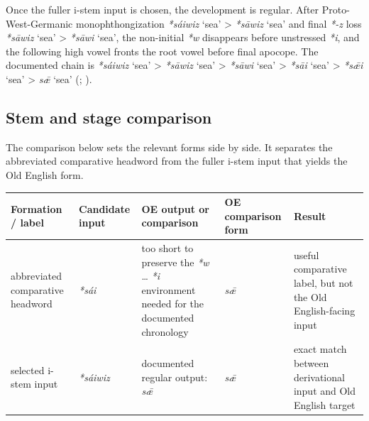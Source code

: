\documentclass[
  british,
  a4paper,
  openany]{book}
\newcounter{none} %
\providecommand{\Recon}[1]{\emph{*#1}}
{\catcode`→=\active \global\def→{\ensuremath{\rightarrow}}}
\providecommand{\Recon}[1]{\emph{*#1}}
{\catcode`→=\active \global\def→{\ensuremath{\rightarrow}}}
\begin{document}
Once the fuller i-stem input is chosen, the development is regular.
After Proto-West-Germanic monophthongization \Recon{sáiwiz} `sea'
\textgreater{} \Recon{sāwiz} `sea' and final \emph{*-z} loss
\Recon{sāwiz} `sea' \textgreater{} \Recon{sāwi} `sea', the non-initial
\emph{*w} disappears before unstressed \emph{*i}, and the following high
vowel fronts the root vowel before final apocope. The documented chain
is \Recon{sáiwiz} `sea' \textgreater{} \Recon{sāwiz} `sea'
\textgreater{} \Recon{sāwi} `sea' \textgreater{} \Recon{sāi} `sea'
\textgreater{} \Recon{sǣi} `sea' \textgreater{} \emph{sǣ} `sea'
(;
).

\subsection{Stem and stage comparison}\label{stem-and-stage-comparison}

The comparison below sets the relevant forms side by side. It separates
the abbreviated comparative headword from the fuller i-stem input that
yields the Old English form.

{\def\LTcaptype{none} %
\begin{longtable}[]{@{}
  >{\raggedright\arraybackslash}p{}
  >{\raggedright\arraybackslash}p{}
  >{\raggedright\arraybackslash}p{}
  >{\raggedright\arraybackslash}p{}
  >{\raggedright\arraybackslash}p{}@{}}
\toprule\noalign{}
\begin{minipage}[b]{\linewidth}\raggedright
Formation / label
\end{minipage} & \begin{minipage}[b]{\linewidth}\raggedright
Candidate input
\end{minipage} & \begin{minipage}[b]{\linewidth}\raggedright
OE output or comparison
\end{minipage} & \begin{minipage}[b]{\linewidth}\raggedright
OE comparison form
\end{minipage} & \begin{minipage}[b]{\linewidth}\raggedright
Result
\end{minipage} \\
\midrule\noalign{}
\endhead
\bottomrule\noalign{}
\endlastfoot
abbreviated comparative headword & {\emph{*sái}} & too short to preserve
the \emph{*w} \ldots{} \emph{*i} environment needed for the documented
chronology & {\emph{sǣ}} & useful comparative label, but not the Old
English-facing input \\
selected i-stem input & {\emph{*sáiwiz}} & documented regular output:
{\emph{sǣ}} & {\emph{sǣ}} & exact match between derivational input and
Old English target \\
\end{longtable}
}
\end{document}
